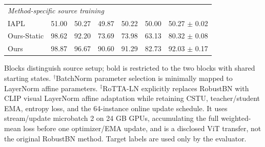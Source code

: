 \begin{table}[t]
{\begin{tabular}{lcccccc}
\midrule
\multicolumn{7}{l}{\textit{Method-specific source training}} \\
IAPL & 51.00 & 50.27 & 49.87 & 50.22 & 50.00 & 50.27 $\pm$ 0.02 \\
Ours-Static & 98.62 & 92.20 & 73.69 & 73.98 & 63.13 & 80.32 $\pm$ 0.08 \\
Ours & 98.87 & 96.67 & 90.60 & 91.29 & 82.73 & 92.03 $\pm$ 0.17 \\
\bottomrule
\end{tabular}%
}
\vspace{2pt}
\parbox{\textwidth}{\footnotesize Blocks distinguish source setup; bold is restricted to the two blocks with shared starting states. $^{\dagger}$BatchNorm parameter selection is minimally mapped to LayerNorm affine parameters. $^{\ddagger}$RoTTA-LN explicitly replaces RobustBN with CLIP visual LayerNorm affine adaptation while retaining CSTU, teacher/student EMA, entropy loss, and the 64-instance online update schedule. It uses stream/update microbatch 2 on 24 GB GPUs, accumulating the full weighted-mean loss before one optimizer/EMA update, and is a disclosed ViT transfer, not the original RobustBN method. Target labels are used only by the evaluator.}
\end{table}
